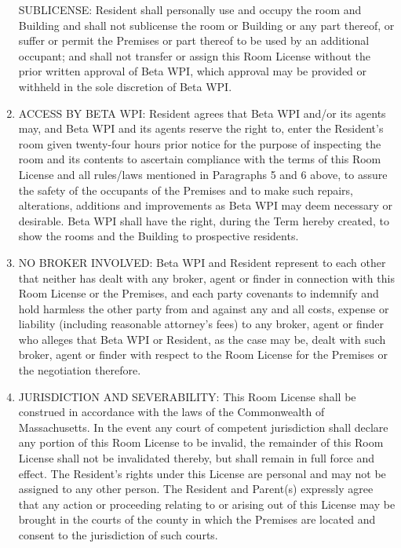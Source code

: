 \documentclass[12pt]{article}
\begin{document}
\begin{enumerate}
SUBLICENSE\@: Resident shall personally use and occupy the room and Building and shall not sublicense the room or Building or any part thereof, or suffer or permit the Premises or part thereof to be used by an additional occupant; and shall not transfer or assign this Room License without the prior written approval of Beta WPI, which approval may be provided or withheld in the sole discretion of Beta WPI\@.

\item\label{itm:access}

ACCESS BY BETA WPI\@: Resident agrees that Beta WPI and/or its agents may, and Beta WPI and its agents reserve the right to, enter the Resident’s room given twenty-four hours prior notice for the purpose of inspecting the room and its contents to ascertain compliance with the terms of this Room License and all rules/laws mentioned in Paragraphs 5 and 6 above, to assure the safety of the occupants of the Premises and to make such repairs, alterations, additions and improvements as Beta WPI may deem necessary or desirable.
Beta WPI shall have the right, during the Term hereby created, to show the rooms and the Building to prospective residents.

\item\label{itm:broker}

NO BROKER INVOLVED\@: Beta WPI and Resident represent to each other that neither has dealt with any broker, agent or finder in connection with this Room License or the Premises, and each party covenants to indemnify and hold harmless the other party from and against any and all costs, expense or liability (including reasonable attorney’s fees) to any broker, agent or finder who alleges that Beta WPI or Resident, as the case may be, dealt with such broker, agent or finder with respect to the Room License for the Premises or the negotiation therefore.

\item\label{itm:jurisdiction}

JURISDICTION AND SEVERABILITY\@: This Room License shall be construed in accordance with the laws of the Commonwealth of Massachusetts.
In the event any court of competent jurisdiction shall declare any portion of this Room License to be invalid, the remainder of this Room License shall not be invalidated thereby, but shall remain in full force and effect.
The Resident’s rights under this License are personal and may not be assigned to any other person.
The Resident and Parent(s) expressly agree that any action or proceeding relating to or arising out of this License may be brought in the courts of the county in which the Premises are located and consent to the jurisdiction of such courts.


\end{enumerate}
\end{document}

